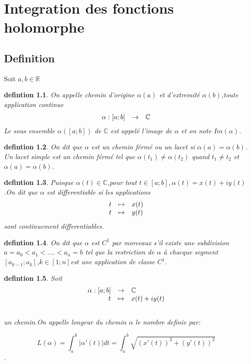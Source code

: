 \documentclass[a4paper,12pt]{book}
\newtheorem{definition}{defintion}[section]
\begin{document}
\tableofcontents
	\chapter{Integration des fonctions holomorphe}
	\section{Definition}
	Soit $ a,b \in\mathbb{R}$ \\
	\begin{definition}
        	On appelle chemin d'origine $ \alpha(a) $ et d'extremité 
	$\alpha(b) $,toute application continue 
\[
	\begin{array}{r c l}
		\alpha:[a;b] & \to & \mathbb{C} \\
	\end{array}
\]
Le sous ensemble $\alpha([a;b]) $ de $\mathbb{C}$ est appelé l'image de $\alpha $ et on note $ Im(\alpha)$.\\ 
    \end{definition}
  \begin{definition}
On dit que  $ \alpha $ est un chemin férmé ou un lacet si $ \alpha(a) = \alpha(b)$.\\Un lacet simple est un chemin férmé tel que $\alpha(t_1) \ne \alpha(t_2)$ quand $ t_1 \ne t_2 $ et $\alpha(a)=\alpha(b)$.\\
\end{definition}
\begin{definition}
 Puisque $\alpha(t)\in \mathbb{C}$,pour tout $ t \in [a;b],\alpha(t)=x(t)+ iy(t)$.On dit que $\alpha$ est differentiable si les applications 
\[
    \begin{array}{r c l}
       	t & \mapsto & x(t) \\ t & \mapsto & y(t)
    	
    \end{array}
\]sont continuement differentiables.\\
\end{definition}
\begin{definition}
 On dit que $\alpha$ est $ C^1$ par morceaux s'il existe une subdivision $ a = a_0<a_1<....<a_n = b $ tel que la restriction de $\alpha$ à chacque segment $[a_{k-1};a_k]$,$ k \in [1;n] $est une application de classe $ C^1$.\\\end{definition} 
\begin{definition}
  Soit 
\[
     \begin{array}{r c l}
     	
     	\alpha : [a;b] & \to & \mathbb{C}\\
     	t & \mapsto& x(t)+ iy(t)
     	
     \end{array}
\]\\un chemin.On appelle longeur du chemin $\alpha$ le nombre definie par:\\ 
\begin{center}
$$ L(\alpha)= \int_{a}^{b} |\alpha'(t)| dt= \int_{a}^{b}\sqrt{(x'(t))^2+ (y'(t))^2}$$.\\ 
\end{center} 
\end{definition}
\end{document}
